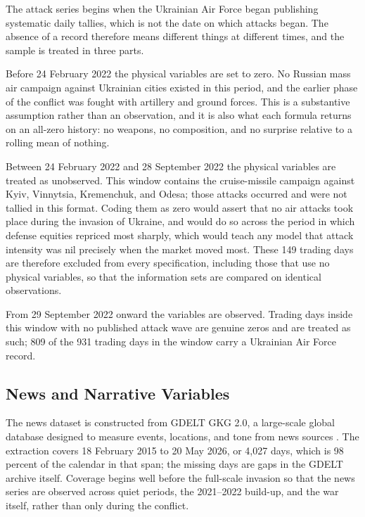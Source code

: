 \documentclass[12pt,a4paper]{article}
\begin{document}
The attack series begins when the Ukrainian Air Force began publishing systematic daily tallies, which is not the date on which attacks began. The absence of a record therefore means different things at different times, and the sample is treated in three parts.

Before 24 February 2022 the physical variables are set to zero. No Russian mass air campaign against Ukrainian cities existed in this period, and the earlier phase of the conflict was fought with artillery and ground forces. This is a substantive assumption rather than an observation, and it is also what each formula returns on an all-zero history: no weapons, no composition, and no surprise relative to a rolling mean of nothing.

Between 24 February 2022 and 28 September 2022 the physical variables are treated as unobserved. This window contains the cruise-missile campaign against Kyiv, Vinnytsia, Kremenchuk, and Odesa; those attacks occurred and were not tallied in this format. Coding them as zero would assert that no air attacks took place during the invasion of Ukraine, and would do so across the period in which defense equities repriced most sharply, which would teach any model that attack intensity was nil precisely when the market moved most. These 149 trading days are therefore excluded from every specification, including those that use no physical variables, so that the information sets are compared on identical observations.

From 29 September 2022 onward the variables are observed. Trading days inside this window with no published attack wave are genuine zeros and are treated as such; 809 of the 931 trading days in the window carry a Ukrainian Air Force record.

\subsection{News and Narrative Variables}
\label{sec:news}

The news dataset is constructed from GDELT GKG 2.0, a large-scale global database designed to measure events, locations, and tone from news sources \citep{leetaru2013gdelt}. The extraction covers 18 February 2015 to 20 May 2026, or 4,027 days, which is 98 percent of the calendar in that span; the missing days are gaps in the GDELT archive itself. Coverage begins well before the full-scale invasion so that the news series are observed across quiet periods, the 2021--2022 build-up, and the war itself, rather than only during the conflict.
\end{document}
